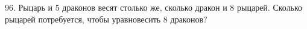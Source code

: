 96. Рыцарь и 5 драконов весят столько же, сколько дракон и 8 рыцарей. Сколько рыцарей потребуется, чтобы уравновесить 8 драконов?\\
